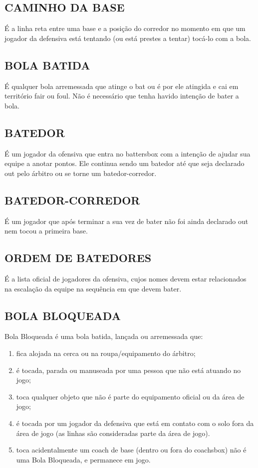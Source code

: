 \subsection{CAMINHO DA BASE}
 É a linha reta entre uma base e a posição do corredor no momento em que um jogador da defensiva está tentando (ou está prestes a tentar) tocá-lo com a bola.

\subsection{BOLA BATIDA}
 É qualquer bola arremessada que atinge o \gls{bat} ou é por ele atingida e cai em território \gls{fair} ou \gls{foul}. Não é necessário que tenha havido intenção de bater a bola.

\subsection{BATEDOR}
 É um jogador da ofensiva que entra no \gls{battersbox} com a intenção de ajudar sua equipe a anotar pontos. Ele continua sendo um batedor até que seja declarado \gls{out} pelo árbitro ou se torne um batedor-corredor.

\subsection{BATEDOR-CORREDOR}
 É um jogador que após terminar a sua vez de bater não foi ainda declarado \gls{out} nem tocou a primeira base.

\subsection{ORDEM DE BATEDORES}
 É a lista oficial de jogadores da ofensiva, cujos nomes devem estar relacionados na escalação da equipe na sequência em que devem bater.
\subsection{BOLA BLOQUEADA}
 Bola Bloqueada é uma bola batida, lançada ou arremessada que:
	\begin{enumerate}[label=(\alph*)]
		\item   fica alojada na cerca ou na roupa/equipamento do árbitro;
		\item  é tocada, parada ou manuseada por uma pessoa que não está atuando no jogo;
		\item  toca qualquer objeto que não é parte do equipamento oficial ou da área  de jogo;
		\item  é tocada por um jogador da defensiva que está em contato com o solo fora da área de jogo (as linhas são consideradas parte da área de jogo).
		\item  toca acidentalmente um \gls{coach} de base (dentro ou fora do \gls{coachsbox}) não é uma Bola Bloqueada, e permanece em jogo.
\end{enumerate}

